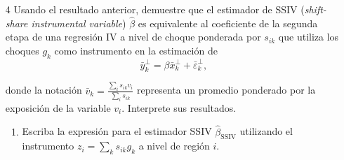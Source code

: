 \documentclass[a4paper, answers, addpoints, 11pt]{exam}
\newenvironment{solucion}{%
  \begin{mdframed}[
    backgroundcolor=blue!5,    %
    linecolor=blue!50,          %
    linewidth=2pt,              %
    leftmargin=10pt,            %
    rightmargin=8pt,           %
    topline=true,              %
    bottomline=true,            %
    roundcorner=10pt,           %
    innerleftmargin=10pt,       %
    innerrightmargin=10pt,      %
    innerbottommargin=10pt,     %
    innertopmargin=10pt         %
  ]%
  \begin{tcolorbox}[colframe=blue!50!black, colback=blue!50, coltitle=white, sharp corners=all, boxrule=1mm, width=\textwidth, halign=left, valign=center, top=0mm, bottom=0mm, left=0mm, right=0mm] \textbf{Solución} \end{tcolorbox} }{\end{mdframed}}
\begin{document}
\begin{enumerate}
\begin{solucion}
\begin{proof}
Ahora, podemos escribir el estimador de regresión simple como:
\begin{align*}
    \hat{\beta} 
    &= \frac{\text{Cov}(y_i^\perp, \hat{x}_i^\perp)}{\text{Var}(\hat{x}_i^\perp)} \\[5pt]
    &= \frac{\sum_i y_i^\perp \hat{x}_i^\perp}{\sum_i (\hat{x}_i^\perp)^2} \\[5pt]
    &= \frac{\sum_i y_i^\perp (\hat{\pi} z_i)}{\sum_i (\hat{\pi} z_i)^2} \\[5pt]
    &= \frac{\hat{\pi} \sum_i y_i^\perp z_i}{\hat{\pi}^2 \sum_i z_i^2} \\[5pt]
    &= \frac{\sum_i y_i^\perp z_i}{\hat{\pi} \sum_i z_i^2} \\[5pt]
    &= \frac{\sum_i y_i^\perp z_i}{\sum_i z_i (\hat{\pi} z_i)} \quad \text{(sabemos que } \hat{\pi} z_i = \hat{x}_i^\perp) \\[5pt]
    &= \frac{\sum_i y_i^\perp z_i}{\sum_i z_i x_i^\perp}\\[5pt]
    &=  \frac{\sum_i z_i y_i^\perp}{\sum_i z_i x_i^\perp} \quad \text{(reordenando) }
\end{align*}

Por el teorema de  Frisch-Waugh-Lovell (FWL), sabemos que el coeficiente instrumentalizado de la regresión estructural es el mismo de la regresión instrumentalizada de $y_i^\perp$  $x_i^\perp$. \textcolor{red}{revisar}

\end{proof}
\end{solucion}

\item[4] Usando el resultado anterior, demuestre que el estimador de SSIV (\textit{shift-share instrumental variable}) $\hat{\beta}$ es equivalente al coeficiente de la segunda etapa de una regresión IV a nivel de choque ponderada por $s_{ik}$ que utiliza los choques $g_k$ como instrumento en la estimación de 
    $$ \bar{y}^\perp_k = \beta \bar{x}^\perp_k + \bar{\varepsilon}^\perp_k, $$

    donde la notación $\bar{v}_k = \frac{\sum_i s_{ik} v_i}{\sum_i s_{ik}}$ representa un promedio ponderado por la exposición de la variable $v_i$. Interprete sus resultados.

    \begin{enumerate}[label=\alph*)]
        \item Escriba la expresión para el estimador SSIV $\hat{\beta}_{\text{SSIV}}$ utilizando el instrumento $z_i = \sum_k s_{ik}g_k$ a nivel de región $i$.
        

\end{enumerate}
\end{enumerate}
\end{document}
